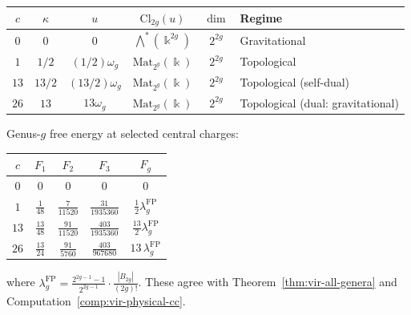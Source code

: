 \begin{computation}
\label{comp:g9-vir-clifford-data}

\begin{center}
\renewcommand{\arraystretch}{1.3}
{\small
\begin{tabular}{cccccl}
\toprule
$c$ & $\kappa$ & $u$ & $\mathrm{Cl}_{2g}(u)$ &
$\dim$ & Regime \\
\midrule
$0$ & $0$ & $0$ &
$\bigwedge^*(\Bbbk^{2g})$ & $2^{2g}$ &
Gravitational \\
$1$ & $1/2$ & $(1/2)\omega_g$ &
$\mathrm{Mat}_{2^g}(\Bbbk)$ & $2^{2g}$ &
Topological \\
$13$ & $13/2$ & $(13/2)\omega_g$ &
$\mathrm{Mat}_{2^g}(\Bbbk)$ & $2^{2g}$ &
Topological (self-dual) \\
$26$ & $13$ & $13\omega_g$ &
$\mathrm{Mat}_{2^g}(\Bbbk)$ & $2^{2g}$ &
Topological (dual: gravitational) \\
\bottomrule
\end{tabular}
}
\end{center}

\medskip\noindent
Genus-$g$ free energy at selected central charges:
\begin{center}
\renewcommand{\arraystretch}{1.3}
{\small
\begin{tabular}{ccccc}
\toprule
$c$ & $F_1$ & $F_2$ & $F_3$ &
$F_g$ \\
\midrule
$0$ & $0$ & $0$ & $0$ & $0$ \\
$1$ & $\frac{1}{48}$ & $\frac{7}{11520}$ &
$\frac{31}{1935360}$ &
$\frac{1}{2}\lambda_g^{\mathrm{FP}}$ \\
$13$ & $\frac{13}{48}$ & $\frac{91}{11520}$ &
$\frac{403}{1935360}$ &
$\frac{13}{2}\lambda_g^{\mathrm{FP}}$ \\
$26$ & $\frac{13}{24}$ & $\frac{91}{5760}$ &
$\frac{403}{967680}$ &
$13\,\lambda_g^{\mathrm{FP}}$ \\
\bottomrule
\end{tabular}
}
\end{center}
where $\lambda_g^{\mathrm{FP}} = \frac{2^{2g-1}-1}{2^{2g-1}} \cdot
\frac{|B_{2g}|}{(2g)!}$. These agree with
Theorem~\ref{thm:vir-all-genera} and
Computation~\ref{comp:vir-physical-cc}.
\end{computation}

%
%

